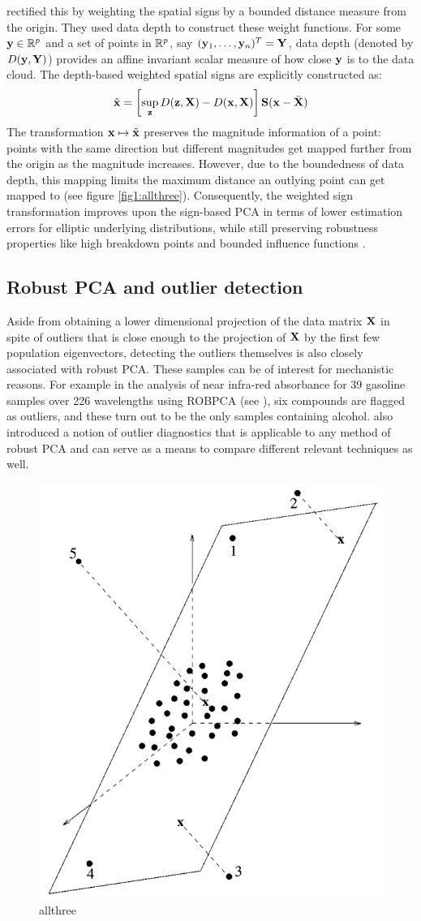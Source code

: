 \cite{Majumdar15} rectified this by weighting the spatial signs by a bounded distance measure from the origin. They used data depth \citep{zuo00} to construct these weight functions. For some ${\bf{y}} \in {\mathbb{R}}^p$ and a set of points in ${\mathbb{R}}^p$, say $({\bf{y}}_1, \ldots, {\bf{y}}_n)^T = {\mathbf{Y}}$, data depth (denoted by $D({\bf{y}}, {\mathbf{Y}})$) provides an affine invariant scalar measure of how close ${\bf{y}}$ is to the data cloud. The depth-based weighted spatial signs \citep{Majumdar15} are explicitly constructed as:
%
\begin{align}
\tilde {{\bf{x}}} = \left[ \sup_{{\bf{z}}} D({\bf{z}}, {\mathbf{X}}) - D({\bf{x}}, {\mathbf{X}}) \right] {\mathbf{S}}( {\bf{x}} - \bar {{\mathbf{X}}} )
\end{align}
%
The transformation ${\bf{x}} \mapsto \tilde {{\bf{x}}}$ preserves the magnitude information of a point: points with the same direction but different magnitudes get mapped further from the origin as the magnitude increases. However, due to the boundedness of data depth, this mapping limits the maximum distance an outlying point can get mapped to (see figure \ref{fig1:allthree}). Consequently, the weighted sign transformation improves upon the sign-based PCA in terms of lower estimation errors for elliptic underlying distributions, while still preserving robustness properties like high breakdown points and bounded influence functions \citep{Majumdar15}.

\subsection*{\sffamily \large Robust PCA and outlier detection}
Aside from obtaining a lower dimensional projection of the data matrix ${\mathbf{X}}$ in spite of outliers that is close enough to the projection of ${\mathbf{X}}$ by the first few population eigenvectors, detecting the outliers themselves is also closely associated with robust PCA. These samples can be of interest for mechanistic reasons. For example in the analysis of near infra-red absorbance for 39 gasoline samples over 226 wavelengths using ROBPCA (see \cite{hubert05}), six compounds are flagged as outliers, and these turn out to be the only samples containing alcohol. \cite{hubert05} also introduced a notion of outlier diagnostics that is applicable to any method of robust PCA and can serve as a means to compare different relevant techniques as well.

\begin{figure}[t]
\centering
\includegraphics[width=.33\textwidth]{ROBPCA_plot}
\caption{allthree}
\label{fig:figROBPCA}
\end{figure}

